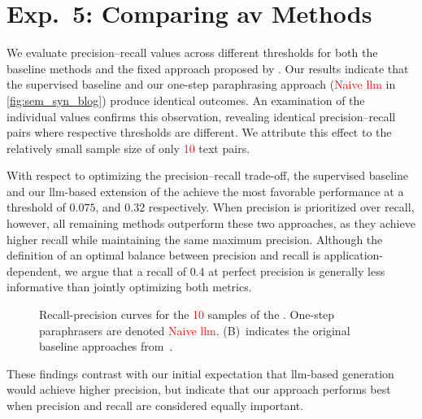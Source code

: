 \section{Exp.\ 5: Comparing \acs{av} Methods}%
\label{subsec:imp_gen_res}

We evaluate precision–recall values across different thresholds for both the baseline methods and the fixed approach proposed by \citet{koppel_determining_2014}.
Our results indicate that the supervised baseline and our one-step paraphrasing approach (\textcolor{red}{Naive \ac{llm}} in \autoref{fig:sem_syn_blog}) produce identical outcomes.
An examination of the individual values confirms this observation, revealing identical precision–recall pairs where respective thresholds are different.
We attribute this effect to the relatively small sample size of only \textcolor{red}{10} text pairs.

With respect to optimizing the precision–recall trade-off, the supervised baseline and our \ac{llm}-based extension of the \impAppr{} achieve the most favorable performance at a threshold of $0.075$, and $0.32$ respectively.
When precision is prioritized over recall, however, all remaining methods outperform these two approaches, as they achieve higher recall while maintaining the same maximum precision.
Although the definition of an optimal balance between precision and recall is application-dependent, we argue that a recall of $0.4$ at perfect precision is generally less informative than jointly optimizing both metrics.

\begin{figure}[htbp]
    \centering
    
    \caption[Recall-precision curves for the \dataStudent{}.]{Recall-precision curves for the \textcolor{red}{10} samples of the \dataStudent{}. 
    One-step paraphrasers are denoted \textcolor{red}{Naive \ac{llm}}.
    (B)~indicates the original baseline approaches from~\citep{koppel_determining_2014}.
    }
    \label{fig:sem_syn_blog}
\end{figure}

These findings contrast with our initial expectation that \ac{llm}-based \imp{} generation would achieve higher precision, but indicate that our approach performs best when precision and recall are considered equally important.
